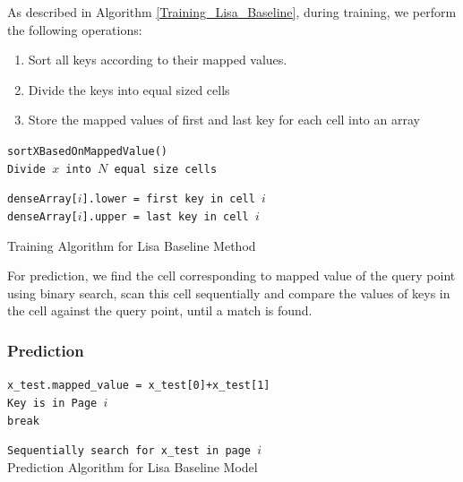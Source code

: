 As described in Algorithm \ref{Training_Lisa_Baseline}, during training, we perform the following operations:

\begin{enumerate}
	\item Sort all keys according to their mapped values.
	\item Divide the keys into equal sized cells
	\item Store the mapped values of first and last key for each cell into an array
\end{enumerate}

\begin{algorithm}[H]
    \SetAlgoLined
     \texttt{sortXBasedOnMappedValue()}\\
     \texttt{Divide $x$ into $N$ equal size cells}\\
     {
         \texttt{denseArray[$i$].lower = first key in cell $i$  } \\
		 \texttt{denseArray[$i$].upper = last key in cell $i$  }
		
     }
     \caption{Training Algorithm for Lisa Baseline Method}
     \label{Training_Lisa_Baseline}
\end{algorithm}

For prediction, we find the cell corresponding to mapped value of the query point using binary search, scan this cell sequentially and compare the values of keys in the cell against the query point, until a match is found.

\subsubsection{Prediction}

\begin{algorithm}[H]
    \SetAlgoLined
    \texttt{x\_test.mapped\_value = x\_test[0]+x\_test[1] } \\
    {
        {
		    \texttt{Key is in Page $i$ } \\
		    \texttt{break }
		}
    }
  
 	 \texttt{Sequentially search for x\_test in page $i$} \\
     \caption{Prediction Algorithm for Lisa Baseline Model }
\end{algorithm}



